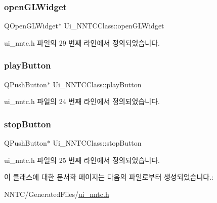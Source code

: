 \subsubsection{\texorpdfstring{open\+G\+L\+Widget}{openGLWidget}}
{\footnotesize\ttfamily Q\+Open\+G\+L\+Widget$\ast$ Ui\+\_\+\+N\+N\+T\+C\+Class\+::open\+G\+L\+Widget\hspace{0.3cm}{\ttfamily [inherited]}}



ui\+\_\+nntc.\+h 파일의 29 번째 라인에서 정의되었습니다.

\mbox{\label{class_ui___n_n_t_c_class_a6e604f467f5d7264f8d23f0cf54a6fdf}} 
\subsubsection{\texorpdfstring{play\+Button}{playButton}}
{\footnotesize\ttfamily Q\+Push\+Button$\ast$ Ui\+\_\+\+N\+N\+T\+C\+Class\+::play\+Button\hspace{0.3cm}{\ttfamily [inherited]}}



ui\+\_\+nntc.\+h 파일의 24 번째 라인에서 정의되었습니다.

\mbox{\label{class_ui___n_n_t_c_class_a748e190a62458531e66a574cc556e32d}} 
\subsubsection{\texorpdfstring{stop\+Button}{stopButton}}
{\footnotesize\ttfamily Q\+Push\+Button$\ast$ Ui\+\_\+\+N\+N\+T\+C\+Class\+::stop\+Button\hspace{0.3cm}{\ttfamily [inherited]}}



ui\+\_\+nntc.\+h 파일의 25 번째 라인에서 정의되었습니다.



이 클래스에 대한 문서화 페이지는 다음의 파일로부터 생성되었습니다.\+:\begin{DoxyCompactItemize}
\item 
N\+N\+T\+C/\+Generated\+Files/\mbox{\hyperlink{ui__nntc_8h}{ui\+\_\+nntc.\+h}}\end{DoxyCompactItemize}
